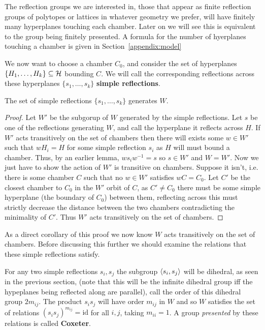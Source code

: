 \documentclass[../main.tex]{subfiles}
\begin{document}
The reflection groups we are interested in, those that appear as finite reflection groups of polytopes or lattices in whatever geometry we prefer, will have finitely many hyperplanes touching each chamber. Later on we will see this is equivalent to the group being finitely presented. A formula for the number of hyerplanes touching a chamber is given in Section~\ref{appendix:model}

We now want to choose a chamber $C_0$, and consider the set of hyperplanes $\{H_1,\ldots,H_k\}\subseteq \mathcal{H}$ bounding $C$. We will call the corresponding reflections across these hyperplanes $\{s_1,\ldots,s_k\}$ \textbf{simple reflections}.

\begin{theorem}
    The set of simple reflections $\{s_1,\ldots, s_k\}$ generates $W$.
    \begin{proof}
        Let $W'$ be the subgorup of $W$ generated by the simple reflections. Let $s$ be one of the reflections generating $W$, and call the hyperplane it reflects across $H$. If $W'$ acts transitively on the set of chambers then there will exists some $w\in W'$ such that $wH_i=H$ for some simple reflection $s_i$ as $H$ will must bound a chamber. Thus, by an earlier lemma, $ws_i w^{-1} = s$ so $s\in W'$ and $W=W'$.
        Now we just have to show the action of $W'$ is transitive on chambers. Suppose it isn't, i.e. there is some chamber $C$ such that no $w\in W'$ satisfies $wC=C_0$. Let $C'$ be the closest chamber to $C_0$ in the $W'$ orbit of $C$, as $C'\neq C_0$ there must be some simple hyperplane (the boundary of $C_0$) between them, reflecting across this must strictly decrease the distance between the two chambers contradicting the minimality of $C'$. Thus $W'$ acts transitively on the set of chambers.
    \end{proof}
\end{theorem}

As a direct corollary of this proof we now know $W$ acts transitively on the set of chambers. Before discussing this further we should examine the relations that these simple reflections satisfy.

For any two simple reflections $s_i,s_j$ the subgroup $\left\langle s_i,s_j \right\rangle$ will be dihedral, as seen in the previous section, (note that this will be the infinite dihedral group iff the hypeplanes being reflected along are parallel), call the order of this dihedral group $2m_{ij}$. The product $s_i s_j$ will have order $m_{ij}$ in $W$ and so $W$ satisfies the set of relations $(s_i s_j)^{m_{ij}}=\text{id}$ for all $i,j$, taking $m_{ii}=1$. A group \textit{presented} by these relations is called \textbf{Coxeter}.
\end{document}
